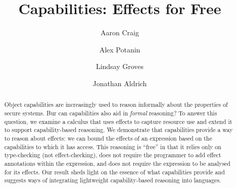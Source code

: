 \documentclass[runningheads]{llncs}
\begin{document}
\title{Capabilities: Effects for Free}

\author{Aaron Craig \and
  Alex Potanin \and
  Lindsay Groves \and
  Jonathan Aldrich}



\maketitle

\begin{abstract}
  Object capabilities are increasingly used to reason informally about
  the properties of secure systems. Bur can capabilities also aid in
  \textit{formal} reasoning? To answer this question, we examine a
  calculus that uses effects to capture resource use and extend it to
  support capability-based
  reasoning. We demonstrate that capabilities provide a way to reason
  about effects: we can bound the effects of an expression
  based on the capabilities to which it has access.  This reasoning is
  ``free'' in that it relies only on type-checking (not
  effect-checking), does not require the programmer to add effect
  annotations within the expression, and does not require the
  expression to be analysed for its effects. Our result sheds light on
  the essence of what capabilities provide and suggests ways of
  integrating lightweight capability-based reasoning into languages.

\end{abstract}






\end{document}
